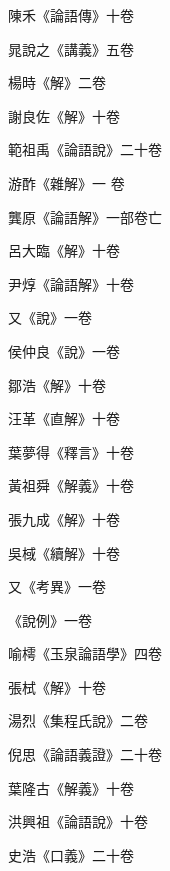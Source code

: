 \begin{pinyinscope}
 陳禾《論語傳》十卷



 晁說之《講義》五卷



 楊時《解》二卷



 謝良佐《解》十卷



 範祖禹《論語說》二十卷



 游酢《雜解》一
 卷



 龔原《論語解》一部卷亡



 呂大臨《解》十卷



 尹焞《論語解》十卷



 又《說》一卷



 侯仲良《說》一卷



 鄒浩《解》十卷



 汪革《直解》十卷



 葉夢得《釋言》十卷



 黃祖舜《解義》十卷



 張九成《解》十卷



 吳棫《續解》十卷



 又《考異》一卷



 《說例》一卷



 喻樗《玉泉論語學》四卷



 張栻《解》十卷



 湯烈《集程氏說》二卷



 倪思《論語義證》二十卷



 葉隆古《解義》十卷



 洪興祖《論語說》十卷



 史浩《口義》二十卷




\end{pinyinscope}
